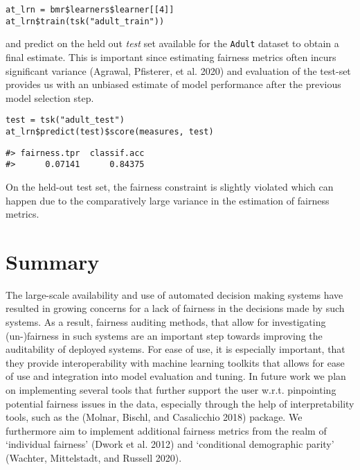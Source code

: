 \begin{verbatim}
at_lrn = bmr$learners$learner[[4]]
at_lrn$train(tsk("adult_train"))
\end{verbatim}

and predict on the held out \emph{test} set available for the \texttt{Adult} dataset to obtain a final estimate.
This is important since estimating fairness metrics often incurs significant variance (Agrawal, Pfisterer, et al. 2020) and evaluation of the test-set provides us with an unbiased estimate of model performance after the previous model selection step.

\begin{verbatim}
test = tsk("adult_test")
at_lrn$predict(test)$score(measures, test)
\end{verbatim}

\begin{verbatim}
#> fairness.tpr  classif.acc 
#>      0.07141      0.84375
\end{verbatim}

On the held-out test set, the fairness constraint is slightly violated which can happen due to the comparatively large variance in the estimation of fairness metrics.

\hypertarget{summary}{%
\section{Summary}\label{summary}}

The large-scale availability and use of automated decision making systems have resulted in growing concerns for a lack of fairness in the decisions made by such systems.
As a result, fairness auditing methods, that allow for investigating (un-)fairness in such systems are an important step towards improving the auditability of deployed systems.
For ease of use, it is especially important, that they provide interoperability with machine learning toolkits that allows for ease of use and integration into model evaluation and tuning.
In future work we plan on implementing several tools that further support the user w.r.t. pinpointing potential fairness issues in the data, especially through the help of interpretability tools, such as the  (Molnar, Bischl, and Casalicchio 2018) package.
We furthermore aim to implement additional fairness metrics from the realm of `individual fairness' (Dwork et al. 2012) and `conditional demographic parity' (Wachter, Mittelstadt, and Russell 2020).

\pagebreak

